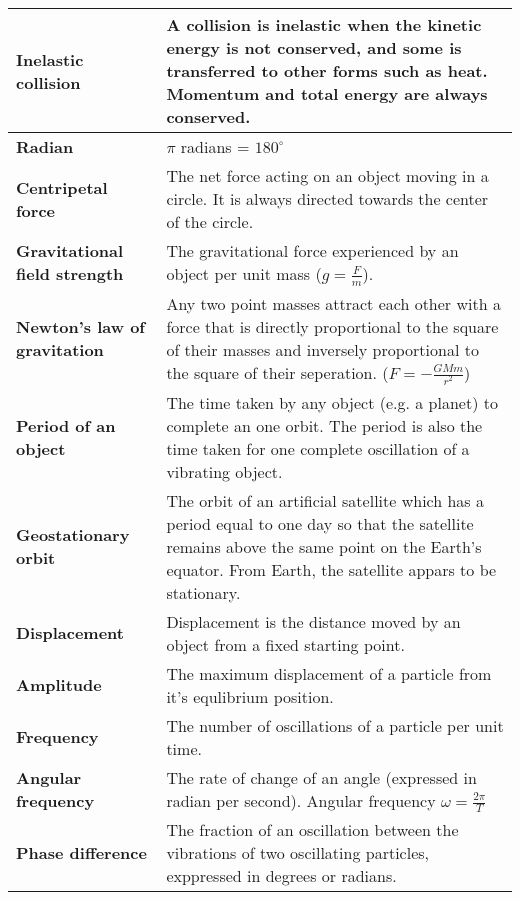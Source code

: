 \documentclass{article}
\begin{document}
\begin{longtable}{>{\bf\centering\arraybackslash}p{1in} 
  p{\textwidth-4\tabcolsep-1in}}
  Inelastic collision & A collision is inelastic when the kinetic
    energy is not conserved, and some is transferred to other forms such as
    heat. Momentum and total energy are always conserved.\\ \midrule
  Radian & $\pi$ radians = $180^\circ$\\ %
  Centripetal force & The net force acting on an object moving in a circle. It 
    is always directed towards the center of the circle. \\ \midrule
  Gravitational field strength & The gravitational force 
    experienced by an object per unit mass ($g = \frac{F}{m}$).\\ \midrule
  Newton's law of gravitation & Any two point masses attract each other with a
    force that is directly proportional to the square of their masses and
    inversely proportional to the square of their seperation. ($F = 
    -\frac{GMm}{r^2}$)\\ \midrule
  Period of an object & The time taken by any object (e.g. a planet) to complete
    an one orbit. \newline \newline The period is also the time taken for one
    complete oscillation of a vibrating object.\\ \midrule
  Geostationary orbit & The orbit of an artificial satellite which has a period
    equal to one day so that the satellite remains above the same point on the
    Earth's equator. \newline \newline From Earth, the satellite appars to be
    stationary.\\ \midrule
  Displacement & Displacement is the distance moved by an object from a fixed
    starting point.\\ \midrule
  Amplitude & The maximum displacement of a particle from it's equlibrium
    position.\\ \midrule
  Frequency & The number of oscillations of a particle per unit time.\\ \midrule
  Angular frequency & The rate of change of an angle (expressed in radian per 
    second). \newline \newline Angular frequency $\omega = \frac{2\pi}{T}$\\ 
    \midrule
  Phase difference & The fraction of an oscillation between the vibrations of
    two oscillating particles, exppressed in degrees or radians.\\ \midrule

\end{longtable}
\end{document}
